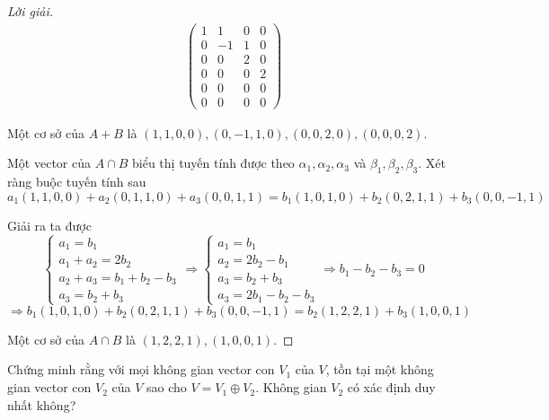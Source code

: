 \documentclass[class=linearalgebra,crop=false]{standalone}
\begin{document}
\begin{proof}[Lời giải]
\begin{align*}
        \begin{pmatrix}
            1 & 1 & 0 & 0 \\
            0 & -1 & 1 & 0 \\
            0 & 0 & 2 & 0 \\
            0 & 0 & 0 & 2 \\
            0 & 0 & 0 & 0 \\
            0 & 0 & 0 & 0
        \end{pmatrix}
    \end{align*}
    \par Một cơ sở của $A + B$ là $(1,1,0,0), (0,-1,1,0), (0,0,2,0), (0,0,0,2)$.
    \par Một vector của $A\cap B$ biểu thị tuyến tính được theo $\alpha_{1}, \alpha_{2}, \alpha_{3}$ và $\beta_{1}, \beta_{2}, \beta_{3}$. Xét ràng buộc tuyến tính sau
        \[ a_{1}(1,1,0,0) + a_{2}(0,1,1,0) + a_{3}(0,0,1,1) = b_{1}(1,0,1,0) + b_{2}(0,2,1,1) + b_{3}(0,0,-1,1) \]
    \par Giải ra ta được
        \[
            \begin{cases}
                a_{1} = b_{1} \\
                a_{1} + a_{2} = 2b_{2} \\
                a_{2} + a_{3} = b_{1} + b_{2} - b_{3} \\
                a_{3} = b_{2} + b_{3}
            \end{cases}
            \Longrightarrow
            \begin{cases}
                a_{1} = b_{1} \\
                a_{2} = 2b_{2} - b_{1} \\
                a_{3} = b_{2} + b_{3} \\
                a_{3} = 2b_{1} - b_{2} - b_{3}
            \end{cases}
            \Longrightarrow
            b_{1} - b_{2} - b_{3} = 0
        \]
        \[
            \Rightarrow b_{1}(1,0,1,0) + b_{2}(0,2,1,1) + b_{3}(0,0,-1,1) = b_{2}(1,2,2,1) + b_{3}(1,0,0,1)
        \]
    \par Một cơ sở của $A\cap B$ là $(1,2,2,1), (1,0,0,1)$.
\end{proof}

\begin{exercise}
    Chứng minh rằng với mọi không gian vector con $V_{1}$ của $V$, tồn tại một không gian vector con $V_{2}$ của $V$ sao cho $V = V_{1}\oplus V_{2}$. Không gian $V_{2}$ có xác định duy nhất không?
\end{exercise}
\end{document}
